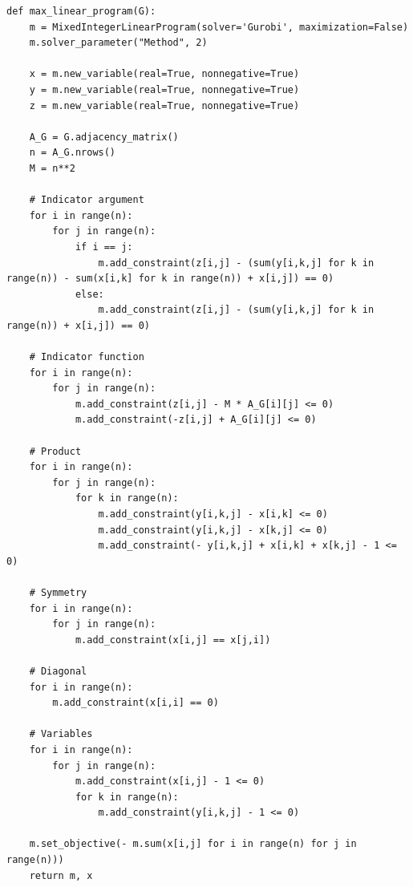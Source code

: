 \begin{lstlisting}[style=python, caption={Max Linear Program.}, label={lst::max_linear_program}]
def max_linear_program(G):
    m = MixedIntegerLinearProgram(solver='Gurobi', maximization=False)
    m.solver_parameter("Method", 2)

    x = m.new_variable(real=True, nonnegative=True)
    y = m.new_variable(real=True, nonnegative=True)
    z = m.new_variable(real=True, nonnegative=True)

    A_G = G.adjacency_matrix()
    n = A_G.nrows()
    M = n**2

    # Indicator argument
    for i in range(n):
        for j in range(n):
            if i == j:
                m.add_constraint(z[i,j] - (sum(y[i,k,j] for k in range(n)) - sum(x[i,k] for k in range(n)) + x[i,j]) == 0)
            else:
                m.add_constraint(z[i,j] - (sum(y[i,k,j] for k in range(n)) + x[i,j]) == 0)

    # Indicator function
    for i in range(n):
        for j in range(n):
            m.add_constraint(z[i,j] - M * A_G[i][j] <= 0)
            m.add_constraint(-z[i,j] + A_G[i][j] <= 0)

    # Product
    for i in range(n):
        for j in range(n):
            for k in range(n):
                m.add_constraint(y[i,k,j] - x[i,k] <= 0)
                m.add_constraint(y[i,k,j] - x[k,j] <= 0)
                m.add_constraint(- y[i,k,j] + x[i,k] + x[k,j] - 1 <= 0)

    # Symmetry
    for i in range(n):
        for j in range(n):
            m.add_constraint(x[i,j] == x[j,i])

    # Diagonal
    for i in range(n):
        m.add_constraint(x[i,i] == 0)

    # Variables
    for i in range(n):
        for j in range(n):
            m.add_constraint(x[i,j] - 1 <= 0)
            for k in range(n):
                m.add_constraint(y[i,k,j] - 1 <= 0)

    m.set_objective(- m.sum(x[i,j] for i in range(n) for j in range(n)))
    return m, x
\end{lstlisting}

